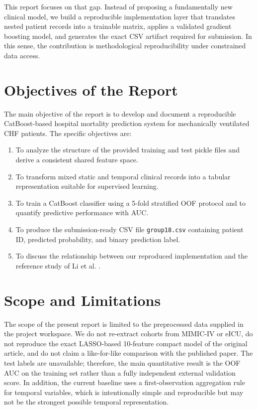 \documentclass[a4paper,12pt]{extreport}
\begin{document}
This report focuses on that gap. Instead of proposing a fundamentally new clinical model, we build a reproducible implementation layer that translates nested patient records into a trainable matrix, applies a validated gradient boosting model, and generates the exact CSV artifact required for submission. In this sense, the contribution is methodological reproducibility under constrained data access.

\section{Objectives of the Report}
The main objective of the report is to develop and document a reproducible CatBoost-based hospital mortality prediction system for mechanically ventilated CHF patients. The specific objectives are:
\begin{enumerate}[leftmargin=1.7em]
    \item To analyze the structure of the provided training and test pickle files and derive a consistent shared feature space.
    \item To transform mixed static and temporal clinical records into a tabular representation suitable for supervised learning.
    \item To train a CatBoost classifier using a 5-fold stratified OOF protocol and to quantify predictive performance with AUC.
    \item To produce the submission-ready CSV file \texttt{group18.csv} containing patient ID, predicted probability, and binary prediction label.
    \item To discuss the relationship between our reproduced implementation and the reference study of Li et al. \cite{li2022prediction}.
\end{enumerate}

\section{Scope and Limitations}
The scope of the present report is limited to the preprocessed data supplied in the project workspace. We do not re-extract cohorts from MIMIC-IV or eICU, do not reproduce the exact LASSO-based 10-feature compact model of the original article, and do not claim a like-for-like comparison with the published paper. The test labels are unavailable; therefore, the main quantitative result is the OOF AUC on the training set rather than a fully independent external validation score. In addition, the current baseline uses a first-observation aggregation rule for temporal variables, which is intentionally simple and reproducible but may not be the strongest possible temporal representation.
\end{document}

